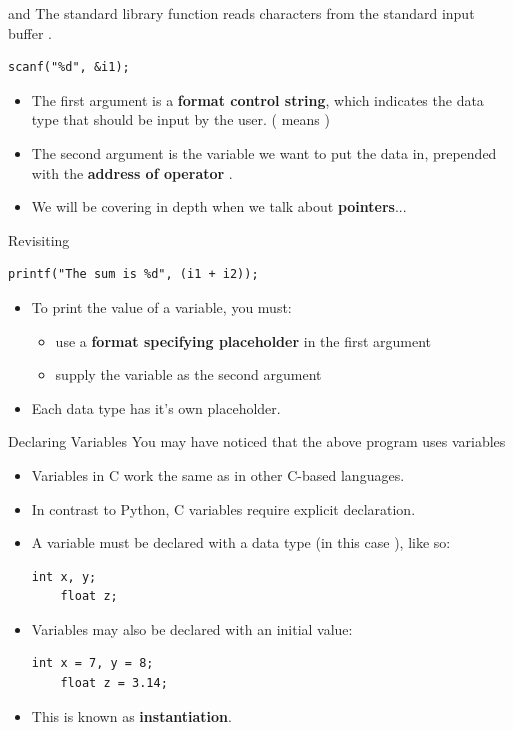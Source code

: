 \documentclass[11pt]{beamer}
\let\OldTexttt\texttt
\renewcommand{\texttt}[1]{\OldTexttt{\color{teal}{#1}}}
\begin{document}
\begin{frame}[fragile=singleslide]{\texttt{scanf} and \texttt{stdin}}
The standard library function \texttt{scanf} reads characters from the standard input buffer \texttt{stdin}.  
\begin{lstlisting}[style=C]
scanf("%d", &i1);
\end{lstlisting}
\begin{itemize}
\item The first argument is a \textbf{format control string}, which indicates the data type that should be input by the user. (\texttt{\%d} means \texttt{int})
\item The second argument is the variable we want \texttt{scanf} to put the data in, prepended with the \textbf{address of operator} \texttt{\&}.
\item We will be covering \texttt{\&} in depth when we talk about \textbf{pointers}...
\end{itemize}
\end{frame}

\begin{frame}[fragile=singleslide]{Revisiting \texttt{printf}}
\begin{lstlisting}[style=C]
printf("The sum is %d", (i1 + i2));
\end{lstlisting}
\begin{itemize}
\item To print the value of a variable, you must:
\begin{itemize}
\item use a \textbf{format specifying placeholder} in the first argument
\item supply the variable as the second argument
\end{itemize}
\item Each data type has it's own placeholder.
\end{itemize}
\end{frame}

\begin{frame}[fragile=singleslide]{Declaring Variables}
You may have noticed that the above program uses variables
\begin{itemize}
\item Variables in C work the same as in other C-based languages.
\item In contrast to Python, C variables require explicit declaration.
\item A variable must be declared with a data type (in this case \texttt{int}), like so:
\begin{lstlisting}[style=C]
	int x, y;
	float z;
\end{lstlisting}
\item Variables may also be declared with an initial value:
\begin{lstlisting}[style=C]
	int x = 7, y = 8;
	float z = 3.14;
\end{lstlisting}
\item This is known as \textbf{instantiation}.
\end{itemize}
\end{frame}
\end{document}
